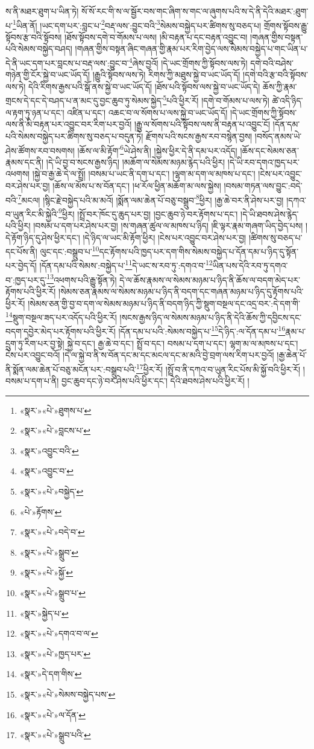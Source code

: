 ས་ནི་མཐར་ཐུག་པ་ཡིན་ཏེ། སོ་སོ་རང་གི་ས་ལ་སྦྱོར་བས་གང་ཞིག་ས་གང་ལ་ཞུགས་པའི་ས་དེ་ནི་དེའི་མཐར་:ཐུག་པ་\footnote{«སྣར་»«པེ་»ཐུགས་པ་}ཡིན་ནོ། །ཡང་དག་པར་:བླང་པ་\footnote{«སྣར་»«པེ་»བླངས་པ་}བརྡ་ལས་:བྱུང་བའི་\footnote{«སྣར་»འབྱུང་བའི་}སེམས་བསྐྱེད་པར་ཚིགས་སུ་བཅད་པ། གྲོགས་སྟོབས་རྒྱུ་སྟོབས་རྩ་བའི་སྟོབས། །ཐོས་སྟོབས་དགེ་བ་གོམས་པ་ལས། །མི་བརྟན་པ་དང་བརྟན་འབྱུང་བ། །གཞན་གྱིས་བསྟན་པའི་སེམས་བསྐྱེད་བཤད། །གཞན་གྱིས་བསྟན་ཞིང་གཞན་གྱི་རྣམ་པར་རིག་བྱེད་ལས་སེམས་བསྐྱེད་པ་གང་ཡིན་པ་དེ་ནི་ཡང་དག་པར་བླངས་པ་བརྡ་ལས་:བྱུང་བ་\footnote{«སྣར་»འབྱུང་བ་}ཞེས་བྱའོ། །དེ་ཡང་གྲོགས་ཀྱི་སྟོབས་ལས་ཏེ། དགེ་བའི་བཤེས་གཉེན་གྱི་ངོར་སྐྱེ་བ་ཡང་ཡོད་དོ། །རྒྱུའི་སྟོབས་ལས་ཏེ། རིགས་ཀྱི་མཐུས་སྐྱེ་བ་ཡང་ཡོད་དོ། །དགེ་བའི་རྩ་བའི་སྟོབས་ལས་ཏེ། དེའི་རིགས་རྒྱས་པའི་སྒོ་ནས་སྐྱེ་བ་ཡང་ཡོད་དོ། །ཐོས་པའི་སྟོབས་ལས་སྐྱེ་བ་ཡང་ཡོད་དེ། ཆོས་ཀྱི་རྣམ་གྲངས་དེ་དང་དེ་བཤད་པ་ན་མང་དུ་བྱང་ཆུབ་ཏུ་སེམས་སྐྱེད་\footnote{«སྣར་»«པེ་»བསྐྱེད་}པའི་ཕྱིར་རོ། །དགེ་བ་གོམས་པ་ལས་ཏེ། ཚེ་འདི་ཉིད་ལ་རྟག་ཏུ་ཉན་པ་དང་། འཛིན་པ་དང་། འཆང་བ་ལ་སོགས་པ་ལས་སྐྱེ་བ་ཡང་ཡོད་དོ། །དེ་ཡང་གྲོགས་ཀྱི་སྟོབས་ལས་ནི་མི་བརྟན་པར་འབྱུང་བར་རིག་པར་བྱའོ། །རྒྱུ་ལ་སོགས་པའི་སྟོབས་ལས་ནི་བརྟན་པ་འབྱུང་ངོ། །དོན་དམ་པའི་སེམས་བསྐྱེད་པར་ཚིགས་སུ་བཅད་པ་བདུན་ཏེ། རྫོགས་པའི་སངས་རྒྱས་རབ་བསྙེན་བྱས། །བསོད་ནམས་ཡེ་ཤེས་ཚོགས་རབ་བསགས། །ཆོས་ལ་མི་རྟོག་\footnote{«པེ་»རྟོགས་}ཡེ་ཤེས་ནི། །སྐྱེས་ཕྱིར་དེ་ནི་དམ་པར་འདོད། །ཆོས་དང་སེམས་ཅན་རྣམས་དང་ནི། །དེ་ཡི་བྱ་བ་སངས་རྒྱས་ཉིད། །མཆོག་ལ་སེམས་མཉམ་རྙེད་པའི་ཕྱིར། །དེ་ཡི་རབ་དགའ་ཁྱད་པར་འཕགས། །སྐྱེ་བ་རྒྱ་ཆེ་དེ་ལ་སྤྲོ། །བསམ་པ་ཡང་ནི་དག་པ་དང་། །ལྷག་མ་དག་ལ་མཁས་པ་དང་། །ངེས་པར་འབྱུང་བར་ཤེས་པར་བྱ། །ཆོས་ལ་མོས་པ་ས་བོན་དང་། །ཕ་རོལ་ཕྱིན་མཆོག་མ་ལས་སྐྱེས། །བསམ་གཏན་ལས་བྱུང་:བདེ་བའི་\footnote{«སྣར་»«པེ་»བདེ་བ་}མངལ། །སྙིང་རྗེ་བསྐྱེད་པའི་མ་མའོ། །སྨོན་ལམ་ཆེན་པོ་བཅུ་བསྒྲུབ་\footnote{«སྣར་»«པེ་»སྒྲུབ་}ཕྱིར། །རྒྱ་ཆེ་བར་ནི་ཤེས་པར་བྱ། །དཀའ་བ་ཡུན་རིང་མི་སྐྱེའི་\footnote{«སྣར་»«པེ་»སྐྱོ་}ཕྱིར། །སྤྲོ་བར་ཁོང་དུ་ཆུད་པར་བྱ། །བྱང་ཆུབ་ཉེ་བར་རྟོགས་པ་དང་། །དེ་ཡི་ཐབས་ཤེས་རྙེད་པའི་ཕྱིར། །བསམ་པ་དག་པར་ཤེས་པར་བྱ། །ས་གཞན་ཚུལ་ལ་མཁས་པ་ཉིད། །ཇི་ལྟར་རྣམ་གཞག་ཡིད་བྱེད་པས། །དེ་རྟོག་ཉིད་དུ་ཤེས་ཕྱིར་དང་། །དེ་ཉིད་ལ་ཡང་མི་རྟོག་ཕྱིར། །ངེས་པར་འབྱུང་བར་ཤེས་པར་བྱ། །ཚིགས་སུ་བཅད་པ་དང་པོས་ནི། ལུང་དང་:བསྒྲུབ་པ་\footnote{«སྣར་»«པེ་»སྒྲུབ་པ་}དང་རྟོགས་པའི་ཁྱད་པར་དག་གིས་སེམས་བསྐྱེད་པ་དོན་དམ་པ་ཉིད་དུ་སྟོན་པར་བྱེད་དོ། །དོན་དམ་པའི་སེམས་:བསྐྱེད་པ་\footnote{«སྣར་»སྐྱེད་པ་}དེ་ཡང་ས་རབ་ཏུ་:དགའ་བ་\footnote{«སྣར་»«པེ་»དགའ་བ་ལ་}ཡིན་པས་དེའི་རབ་ཏུ་དགའ་བ་:ཁྱད་པར་དུ་\footnote{«སྣར་»«པེ་»ཁྱད་པར་}འཕགས་པའི་རྒྱུ་སྟོན་ཏེ། དེ་ལ་ཆོས་རྣམས་ལ་སེམས་མཉམ་པ་ཉིད་ནི་ཆོས་ལ་བདག་མེད་པར་རྟོགས་པའི་ཕྱིར་རོ། །སེམས་ཅན་རྣམས་ལ་སེམས་མཉམ་པ་ཉིད་ནི་བདག་དང་གཞན་མཉམ་པ་ཉིད་དུ་རྟོགས་པའི་ཕྱིར་རོ། །སེམས་ཅན་གྱི་བྱ་བ་དག་ལ་སེམས་མཉམ་པ་ཉིད་ནི་བདག་ཉིད་ཀྱི་སྡུག་བསྔལ་དང་འདྲ་བར་:དེ་དག་གི་\footnote{«སྣར་»དེ་དག་གིས་}སྡུག་བསྔལ་ཟད་པར་འདོད་པའི་ཕྱིར་རོ། །སངས་རྒྱས་ཉིད་ལ་སེམས་མཉམ་པ་ཉིད་ནི་དེའི་ཆོས་ཀྱི་དབྱིངས་དང་བདག་དབྱེར་མེད་པར་རྟོགས་པའི་ཕྱིར་རོ། །དོན་དམ་པ་པའི་:སེམས་བསྐྱེད་པ་\footnote{«སྣར་»«པེ་»སེམས་བསྐྱེད་པས་}དེ་ཉིད་:ལ་དོན་དམ་པ་\footnote{«སྣར་»«པེ་»ལ་དོན་}རྣམ་པ་དྲུག་ཏུ་རིག་པར་བྱ་སྟེ། སྐྱེ་བ་དང་། རྒྱ་ཆེ་བ་དང་། སྤྲོ་བ་དང་། བསམ་པ་དག་པ་དང་། ལྷག་མ་ལ་མཁས་པ་དང་། ངེས་པར་འབྱུང་བའོ། །དེ་ལ་སྐྱེ་བ་ནི་ས་བོན་དང་མ་དང་མངལ་དང་མ་མའི་བྱེ་བྲག་ལས་རིག་པར་བྱའོ། །རྒྱ་ཆེན་པོ་ནི་སྨོན་ལམ་ཆེན་པོ་བཅུ་མངོན་པར་:བསྒྲུབ་པའི་\footnote{«སྣར་»«པེ་»སྒྲུབ་པའི་}ཕྱིར་རོ། །སྤྲོ་བ་ནི་དཀའ་བ་ཡུན་རིང་པོས་མི་སྐྱོ་བའི་ཕྱིར་རོ། །བསམ་པ་དག་པ་ནི། བྱང་ཆུབ་དང་ཉེ་བར་ཤེས་པའི་ཕྱིར་དང་། དེའི་ཐབས་ཤེས་པའི་ཕྱིར་རོ། །
